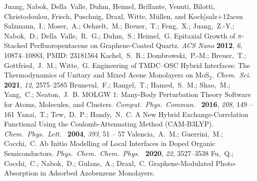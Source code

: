 \documentclass[journal=jpclcd,manuscript=letter]{achemso}
\begin{document}
\begin{mcitethebibliography}{51}
  Juang, Nabok, Della~Valle, Duhm, Heimel, Brillante, Venuti, Bilotti,
  Christodoulou, Frisch, Puschnig, Draxl, Witte, M\"ullen, and
  Koch]{salz+12acsn}
Salzmann,~I.; Moser,~A.; Oehzelt,~M.; Breuer,~T.; Feng,~X.; Juang,~Z.-Y.;
  Nabok,~D.; Della~Valle,~R.~G.; Duhm,~S.; Heimel,~G.   Epitaxial
  Growth of $\pi$-Stacked Perfluoropentacene on Graphene-Coated Quartz.
  \emph{ACS Nano} \textbf{2012}, \emph{6}, 10874--10883, PMID: 23181564\relax
\mciteBstWouldAddEndPuncttrue
\mciteSetBstMidEndSepPunct{\mcitedefaultmidpunct}
{\mcitedefaultendpunct}{\mcitedefaultseppunct}\relax
\EndOfBibitem
{}
Kachel,~S.~R.; Dombrowski,~P.-M.; Breuer,~T.; Gottfried,~J.~M.; Witte,~G.
  Engineering of TMDC–OSC Hybrid Interfaces: The Thermodynamics of Unitary
  and Mixed Acene Monolayers on MoS$_2$. \emph{Chem.~Sci.~} \textbf{2021},
  \emph{12}, 2575--2585\relax
\mciteBstWouldAddEndPuncttrue
\mciteSetBstMidEndSepPunct{\mcitedefaultmidpunct}
{\mcitedefaultendpunct}{\mcitedefaultseppunct}\relax
\EndOfBibitem
{}
Bruneval,~F.; Rangel,~T.; Hamed,~S.~M.; Shao,~M.; Yang,~C.; Neaton,~J.~B. MOLGW
  1: Many-Body Perturbation Theory Software for Atoms, Molecules, and Clusters.
  \emph{Comput.~Phys.~Commun.~} \textbf{2016}, \emph{208}, 149 -- 161\relax
\mciteBstWouldAddEndPuncttrue
\mciteSetBstMidEndSepPunct{\mcitedefaultmidpunct}
{\mcitedefaultendpunct}{\mcitedefaultseppunct}\relax
\EndOfBibitem
{}
Yanai,~T.; Tew,~D.~P.; Handy,~N.~C. A New Hybrid Exchange-Correlation
  Functional Using the Coulomb-Attenuating Method (CAM-B3LYP).
  \emph{Chem.~Phys.~Lett.~} \textbf{2004}, \emph{393}, 51 -- 57\relax
\mciteBstWouldAddEndPuncttrue
\mciteSetBstMidEndSepPunct{\mcitedefaultmidpunct}
{\mcitedefaultendpunct}{\mcitedefaultseppunct}\relax
\EndOfBibitem
{}
Valencia,~A.~M.; Guerrini,~M.; Cocchi,~C. Ab Initio Modelling of Local
  Interfaces in Doped Organic Semiconductors. \emph{Phys.~Chem.~Chem.~Phys.~}
  \textbf{2020}, \emph{22}, 3527--3538\relax
\mciteBstWouldAddEndPuncttrue
\mciteSetBstMidEndSepPunct{\mcitedefaultmidpunct}
{\mcitedefaultendpunct}{\mcitedefaultseppunct}\relax
\EndOfBibitem
{}
Fu,~Q.; Cocchi,~C.; Nabok,~D.; Gulans,~A.; Draxl,~C. Graphene-Modulated
  Photo-Absorption in Adsorbed Azobenzene Monolayers.

\end{mcitethebibliography}
\end{document}
